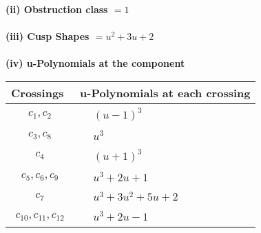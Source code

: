 \documentclass[1p]{elsarticle_modified}
\theoremstyle{definition}
\begin{document}
\flushleft \textbf{(ii) Obstruction class $= 1$}\\~\\
\flushleft \textbf{(iii) Cusp Shapes $= u^2+3 u+2$}\\~\\
\newpage\renewcommand{\arraystretch}{1}
\flushleft \textbf{(iv) u-Polynomials at the component}\newline \\
\begin{tabular}{m{50pt}|m{274pt}}
Crossings & \hspace{64pt}u-Polynomials at each crossing \\
\hline $$\begin{aligned}c_{1},c_{2}\end{aligned}$$&$\begin{aligned}
&(u-1)^3
\end{aligned}$\\
\hline $$\begin{aligned}c_{3},c_{8}\end{aligned}$$&$\begin{aligned}
&u^3
\end{aligned}$\\
\hline $$\begin{aligned}c_{4}\end{aligned}$$&$\begin{aligned}
&(u+1)^3
\end{aligned}$\\
\hline $$\begin{aligned}c_{5},c_{6},c_{9}\end{aligned}$$&$\begin{aligned}
&u^3+2 u+1
\end{aligned}$\\
\hline $$\begin{aligned}c_{7}\end{aligned}$$&$\begin{aligned}
&u^3+3 u^2+5 u+2
\end{aligned}$\\
\hline $$\begin{aligned}c_{10},c_{11},c_{12}\end{aligned}$$&$\begin{aligned}
&u^3+2 u-1
\end{aligned}$\\
\hline
\end{tabular}\\~\\
\newpage\renewcommand{\arraystretch}{1}
\end{document}
